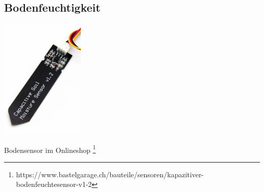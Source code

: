 \documentclass[
  12pt, %
  a4paper, %
  twoside, %
  openany, %
  numbers=noenddot, %
  BCOR=5mm, %
  parskip=half*, %
  thesis, %
]{bfhbook}
\newcommand{\compImgSize}{4cm}
\begin{document}
\subsection{Bodenfeuchtigkeit}\label{moistV1.2}
\begin{center}
\includegraphics[width=\compImgSize, left]{Bilder/Soil-2.jpg}%
\label{labelname}%
\end{center}
Bodensensor im Onlineshop \footnote{https://www.bastelgarage.ch/bauteile/sensoren/kapazitiver-bodenfeuchtesensor-v1-2}
\end{document}
